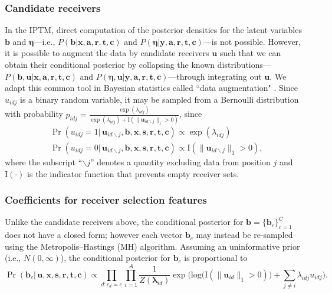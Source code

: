 \documentclass[ba]{imsart}
\numberwithin{equation}{section}
\theoremstyle{plain}
\begin{document}
	\subsubsection{Candidate receivers}
	In the IPTM, direct computation of the posterior densities for the latent variables $\boldsymbol{b}$ and $\boldsymbol{\eta}$---i.e., $P(\boldsymbol{b}|\boldsymbol{x},\boldsymbol{a}, \boldsymbol{r},\boldsymbol{t}, \boldsymbol{c})$ and $P(\boldsymbol{\eta}|\boldsymbol{y},\boldsymbol{a}, \boldsymbol{r},\boldsymbol{t}, \boldsymbol{c})$---is not possible. However, it is possible to augment the data by candidate receivers $\boldsymbol{u}$ such that we can obtain their conditional posterior by collapsing the known distributions---$P(\boldsymbol{b}, \boldsymbol{u}|\boldsymbol{x},\boldsymbol{a}, \boldsymbol{r},\boldsymbol{t}, \boldsymbol{c})$ and $P(\boldsymbol{\eta}, \boldsymbol{u}| \boldsymbol{y},\boldsymbol{a}, \boldsymbol{r},\boldsymbol{t}, \boldsymbol{c})$---through integrating out $\boldsymbol{u}$. We adapt this common tool in Bayesian statistics called ``data augmentation" \citep{tanner1987calculation,neal2015exact}. Since $u_{idj}$ is a binary random variable, it may be sampled from a Bernoulli distribution with probability $p_{idj} =\frac{\exp(\lambda_{idj})}{\exp(\lambda_{idj})+\text{I}(\lVert\boldsymbol{u}_{id\backslash j}\rVert_1 > 0 )}$, since
		\begin{equation}
				\begin{aligned}
			&\Pr(u_{idj}=1| \,\boldsymbol{u}_{id\backslash j}, \boldsymbol{b}, \boldsymbol{x},\boldsymbol{s}, \boldsymbol{r},\boldsymbol{t},\boldsymbol{c}) \propto \exp(\lambda_{idj}) \\
			&\Pr(u_{idj}=0|\, \boldsymbol{u}_{id\backslash j},\boldsymbol{b}, \boldsymbol{x},\boldsymbol{s}, \boldsymbol{r},\boldsymbol{t},\boldsymbol{c})\propto \text{I}(\lVert\boldsymbol{u}_{id\backslash j}\rVert_1 > 0 ),
		\end{aligned}
		\label{eqn:latentreceiver}
	\end{equation}
	where the subscript ``$\backslash j$'' denotes a quantity excluding data from position $j$ and $\text{I}(\cdot)$ is the indicator function that prevents empty receiver sets. 
	\subsubsection{Coefficients for receiver selection features}
	Unlike the candidate receivers above, the conditional posterior for $\boldsymbol{b}=\{\boldsymbol{b}_c\}_{c=1}^C$ does not have a closed form; however each vector $\boldsymbol{b}_c$ may instead be re-sampled using the Metropolis--Hastings (MH) algorithm. Assuming an uninformative prior (i.e., $N({0},\infty)$), the conditional posterior for $\boldsymbol{b}_c$ is proportional to~
	\begin{equation}
		\Pr(\boldsymbol{b}_c| \,\boldsymbol{u}, \boldsymbol{x}, \boldsymbol{s}, \boldsymbol{r},\boldsymbol{t},\boldsymbol{c})\propto \prod_{d:c_d=c}
		\prod_{i=1}^A \frac{1}{Z(\boldsymbol{\lambda}_{id})}\exp\Big(\mbox{log}\big(\text{I}( \lVert \boldsymbol{u}_{id}\rVert_1 > 0)\big) + \sum\limits_{j \neq i} \lambda_{idj}u_{idj}\Big).
		\label{eqn:latentedge}
	\end{equation}
\end{document}
